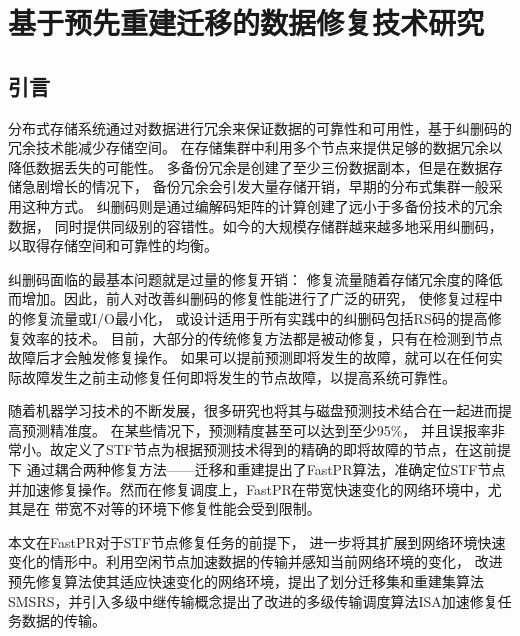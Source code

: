 \chapter{基于预先重建迁移的数据修复技术研究}
\label{chapter:3}
\section{引言}

分布式存储系统通过对数据进行冗余来保证数据的可靠性和可用性，基于纠删码的冗余技术能减少存储空间。
在存储集群中利用多个节点来提供足够的数据冗余以降低数据丢失的可能性。
多备份冗余是创建了至少三份数据副本，但是在数据存储急剧增长的情况下，
备份冗余会引发大量存储开销，早期的分布式集群一般采用这种方式。
纠删码则是通过编解码矩阵的计算创建了远小于多备份技术的冗余数据，
同时提供同级别的容错性\cite{weatherspoon2002erasure}。如今的大规模存储群越来越多地采用纠删码\cite{ford2010availability,huang2012erasure,muralidhar2014f4,ovsiannikov2013quantcast}，
以取得存储空间和可靠性的均衡。

纠删码面临的最基本问题就是过量的修复开销：
修复流量随着存储冗余度的降低而增加\cite{dimakis2010network}。因此，前人对改善纠删码的修复性能进行了广泛的研究，
使修复过程中的修复流量或I/O最小化\citep{dimakis2010network,huang2012erasure,sathiamoorthy2013xoring}，
或设计适用于所有实践中的纠删码包括RS码的提高修复效率的技术\citep{bhagwan2004total,li2017repair,li2019openec,mitra2016partial,shen2016reconsidering,silberstein2014lazy}。
目前，大部分的传统修复方法都是被动修复，只有在检测到节点故障后才会触发修复操作。
如果可以提前预测即将发生的故障，就可以在任何实际故障发生之前主动修复任何即将发生的节点故障，以提高系统可靠性。

随着机器学习技术的不断发展，很多研究也将其与磁盘预测技术结合在一起进而提高预测精准度。
在某些情况下，预测精度甚至可以达到至少95\%\cite{botezatu2016predicting,li2014hard,mahdisoltani2017proactive,zhu2013proactive}，
并且误报率非常小。故\citet{shen2019fast}定义了STF节点为根据预测技术得到的精确的即将故障的节点，在这前提下
通过耦合两种修复方法——迁移和重建提出了FastPR算法，准确定位STF节点并加速修复操作。然而在修复调度上，FastPR在带宽快速变化的网络环境中，尤其是在
带宽不对等的环境下修复性能会受到限制。

本文在FastPR对于STF节点修复任务的前提下， 进一步将其扩展到网络环境快速变化的情形中。利用空闲节点加速数据的传输并感知当前网络环境的变化，
改进预先修复算法使其适应快速变化的网络环境，提出了划分迁移集和重建集算法SMSRS，并引入多级中继传输概念提出了改进的多级传输调度算法ISA加速修复任务数据的传输。

